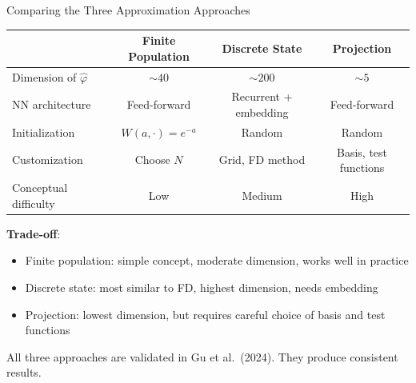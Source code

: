 \documentclass[aspectratio=169,11pt]{beamer}
\newcommand{\emphc}[1]{\textcolor{harvardcrimson}{#1}}
\begin{document}
\begin{frame}{Comparing the Three Approximation Approaches}
\small
\begin{center}
\small
\renewcommand{\arraystretch}{1.2}
\begin{tabular}{lccc}
\toprule
& \textbf{Finite Population} & \textbf{Discrete State} & \textbf{Projection} \\
\midrule
Dimension of $\hat{\varphi}$ & $\sim 40$ & $\sim 200$ & $\sim 5$ \\
NN architecture & Feed-forward & Recurrent + embedding & Feed-forward \\
Initialization & $W(a,\cdot) = e^{-a}$ & Random & Random \\
Customization & Choose $N$ & Grid, FD method & Basis, test functions \\
Conceptual difficulty & Low & Medium & High \\
\bottomrule
\end{tabular}
\end{center}

\vspace{0.3em}
\textbf{Trade-off}:
\begin{itemize}\itemsep1pt
    \item Finite population: simple concept, moderate dimension, works well in practice
    \item Discrete state: most similar to FD, highest dimension, needs embedding
    \item Projection: \emphc{lowest dimension}, but requires careful choice of basis and test functions
\end{itemize}

\vspace{0.2em}
{\small All three approaches are validated in Gu et al.\ (2024). They produce \emphc{consistent results}.}
\end{frame}
\end{document}
